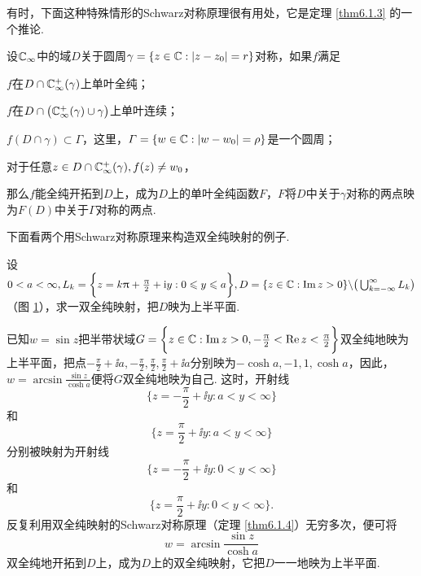 有时，下面这种特殊情形的Schwarz对称原理很有用处，它是定理 \ref{thm6.1.3} 的一个推论.
\begin{theorem}\label{thm6.1.4}
  设$\mathbb C_\infty$中的域$D$关于圆周$\gamma=\{z\in\mathbb C:|z-z_0|=r\}$对称，如果$f$满足
  \begin{eenum}
    \item $f$在$D\cap\mathbb C_\infty^+(\gamma)$上单叶全纯；
    \item $f$在$D\cap\big(\mathbb C_\infty^+(\gamma)\cup\gamma\big)$上单叶连续；
    \item $f(D\cap\gamma)\subset\Gamma$，这里，$\varGamma=\{w\in\mathbb C:|w-w_0|=\rho\}$是一个圆周；
    \item 对于任意$z\in D\cap\mathbb C_\infty^+(\gamma),f(z)\ne w_0$，
  \end{eenum}
  那么$f$能全纯开拓到$D$上，成为$D$上的单叶全纯函数$F$，$F$将$D$中关于$\gamma$对称的两点映为$F(D)$中关于$\Gamma$对称的两点.
\end{theorem}

下面看两个用Schwarz对称原理来构造双全纯映射的例子.
\begin{example}\label{exam6.1.5}
  设$0<a<\infty,L_k=\bigg\{z=k\uppi+\frac{\uppi}2+\mathrm i y:0\leqslant y\leqslant a\bigg\},D=\{z\in\mathbb C:\operatorname{Im} z>0\}\backslash\big(\bigcup_{k=-\infty}^\infty L_k\big)$（图 \ref{fig6.2}），求一双全纯映射，把$D$映为上半平面.
\end{example}
\begin{figure}[!ht]
  \centering
  \caption{\label{fig6.2}}
\end{figure}
\begin{solution}
  已知$w=\sin z$把半带状域$G=\bigg\{z\in\mathbb C:\operatorname{Im} z>0,-\frac{\uppi}2<\operatorname{Re} z<\frac{\uppi}2\bigg\}$双全纯地映为上半平面，把点$-\frac\pi2+\ii a,-\frac\pi2,\frac\pi2,\frac\pi2+\ii a$分别映为$-\cosh a,-1,1,\cosh a$，因此，$w=\arcsin\frac{\sin z}{\cosh a}$便将$G$双全纯地映为自己. 这时，开射线
  \[
    \bigg\{z=-\frac\pi2+\ii y:a<y<\infty\bigg\}
  \]
  和
  \[
    \bigg\{z=\frac\pi2+\ii y:a<y<\infty\bigg\}
  \]
  分别被映射为开射线
  \[
    \bigg\{z=-\frac\pi2+\ii y:0<y<\infty\bigg\}
  \]
  和
  \[
    \bigg\{z=\frac\pi2+\ii y:0<y<\infty\bigg\}.
  \]
  反复利用双全纯映射的Schwarz对称原理（定理 \ref{thm6.1.4}）无穷多次，便可将
  \[
    w = \arcsin\frac{\sin z}{\cosh a}
  \]
  双全纯地开拓到$D$上，成为$D$上的双全纯映射，它把$D$一一地映为上半平面.
\end{solution}

